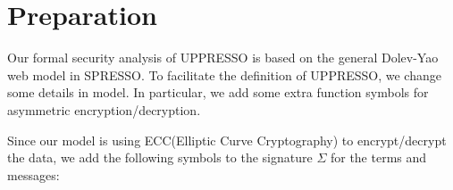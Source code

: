 \documentclass[letterpaper,onecolumn,10pt]{article}
\begin{document}
\renewcommand{\algorithmicrequire}{\textbf{Input:}}
\newcommand{\deflet}{\textbf{let}}
\newcommand{\mystate}[1]{\STATE \textbf{let} {{}#1}}
\newcommand{\mystop}[1]{\STATE \textbf{stop} \myss{\myangle{{{}#1}}, s'}}
\newcommand{\mystopp}[1]{\STATE \textbf{stop} \myss{\myangle{{{}#1}}}}
\newcommand{\myss}[1]{${{}#1}$}
\newcommand{\myangle}[1]{\langle {{}#1} \rangle}
\newcommand{\myif}[1]{\IF{\myss{{{}#1}}}}
\newcommand{\myelse}[1]{\ELSIF{\myss{{{}#1}}}}

\newcommand{\aaa}[1]{\STATE \textbf{if} #1 \textbf{then} \begin{ALC@g}}
\newcommand{\bbb}[1]{\end{ALC@g} \STATE \textbf{else if} #1 \textbf{then} \begin{ALC@g}}
\newcommand{\ccc}{\end{ALC@g} \STATE \textbf{else} \textbf{then} \begin{ALC@g}}
\newcommand{\ddd}{\end{ALC@g} \STATE \textbf{endif}}

\newcommand{\SWITCH}[1]{\STATE \textbf{switch} #1\ \textbf{do} \begin{ALC@g}}
\newcommand{\ENDSWITCH}{\end{ALC@g}\STATE \textbf{end switch}}
\newcommand{\CASE}[1]{\STATE \textbf{case} #1\textbf{:} \begin{ALC@g}}
\newcommand{\ENDCASE}{\end{ALC@g}}
\newcommand{\CASELINE}[1]{\STATE \textbf{case} #1\textbf{:} }
\newcommand{\DEFAULT}{\STATE \textbf{default:} \begin{ALC@g}}
\newcommand{\ENDDEFAULT}{\end{ALC@g}}
\newcommand{\DEFAULTLINE}[1]{\STATE \textbf{default:} }


\renewcommand{\thesection}{\Alph{section}} 


\section{Preparation}

Our formal security analysis of UPPRESSO is based on the general Dolev-Yao web model
in SPRESSO.  To facilitate the definition of UPPRESSO, we change some details in
model. In particular, we add some extra function symbols for asymmetric encryption/decryption.

Since our model is using ECC(Elliptic Curve Cryptography) to encrypt/decrypt the data,
we add the following symbols to the signature $\Sigma$ for the terms and messages:
\end{document}
